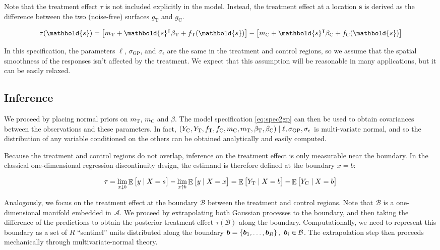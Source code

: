 \documentclass[letter]{article}
\DeclareMathOperator{\E}{\mathbb{E}}
\newcommand{\trans}{^{\intercal}}
\newcommand{\area}{\mathcal{A}}
\newcommand{\treat}{\mathrm{T}}
\newcommand{\ctrol}{\mathrm{C}}
\newcommand{\sigmaf}{\sigma_{\mathrm{GP}}}
\newcommand{\sigman}{\sigma_{\epsilon}}
\newcommand{\svec}{\mathbold{s}}
\newcommand{\boundary}{\mathcal{B}}
\newcommand{\sentinels}{\bm{b}}
\newcommand{\eqlabel}[1]{\label{#1}}
\newcommand{\numsent}{R}
\begin{document}
    	Note that the treatment effect \(\tau\) is not included explicitly in the model. Instead, the treatment effect at a location \(\svec\) is derived as the difference between the two (noise-free) surfaces \(g_\treat{}\) and \(g_\ctrol{}\).

\begin{equation}
\tau(\svec) = \sbr{m_\treat{} + \svec\trans\beta_\treat{} + f_\treat{}(\svec)} - \sbr{m_\ctrol{} + \svec\trans\beta_\ctrol{} + f_\ctrol{}(\svec)}
\end{equation}

In this specification, the parameters \(\ell\), \(\sigmaf\), and \(\sigman\) are the same in the treatment and control regions, so we assume that the spatial smoothness of the responses isn't affected by the treatment.
We expect that this assumption will be reasonable in many applications, but it can be easily relaxed.
    


    	\subsection{Inference}\label{inference}

We proceed by placing normal priors on \(m_\treat\), \(m_\ctrol\) and \(\beta\).
The model specification \eqref{eq:spec2gp} can then be used to obtain covariances between the observations and these parameters.
In fact, \(\del{Y_{\ctrol},Y_{\treat},f_{\treat},f_{\ctrol},m_{\ctrol},m_{\treat},\beta_{\treat}, \beta_{\ctrol}} \mid \ell,\sigmaf, \sigman\) is multi-variate normal, and so the distribution of any variable conditioned on the others can be obtained analytically and easily computed.
    


    	Because the treatment and control regions do not overlap, inference on the treatment effect is only measurable near the boundary. In the classical one-dimensional regression discontinuity design, the estimand is therefore defined at the boundary \(x=b\):

\begin{equation}
\eqlabel{eq:rdd_univ_estimand}
\tau = \lim_{x \downarrow b} \E\sbr{y \mid X=s} - \lim_{x \uparrow b} \E\sbr{y \mid X=x} = \E\sbr{Y_\treat{} \mid X=b} - \E\sbr{Y_\ctrol{} \mid X=b}
\end{equation}

Analogously, we focus on the treatment effect at the boundary \(\boundary\) between the treatment and control regions.
Note that \(\boundary\) is a one-dimensional manifold embedded in \(\area\).
We proceed by extrapolating both Gaussian processes to the boundary,
and then taking the difference of the predictions to obtain the posterior treatment effect \(\tau(\boundary)\) along the boundary.
Computationally, we need to represent this boundary as a set of \(\numsent\) ``sentinel'' units distributed along the boundary \(\sentinels=\cbr{\sentinels_1,\ldots,\sentinels_{\numsent}},~\sentinels_i \in \boundary\).
The extrapolation step then proceeds mechanically through multivariate-normal theory.
\end{document}
